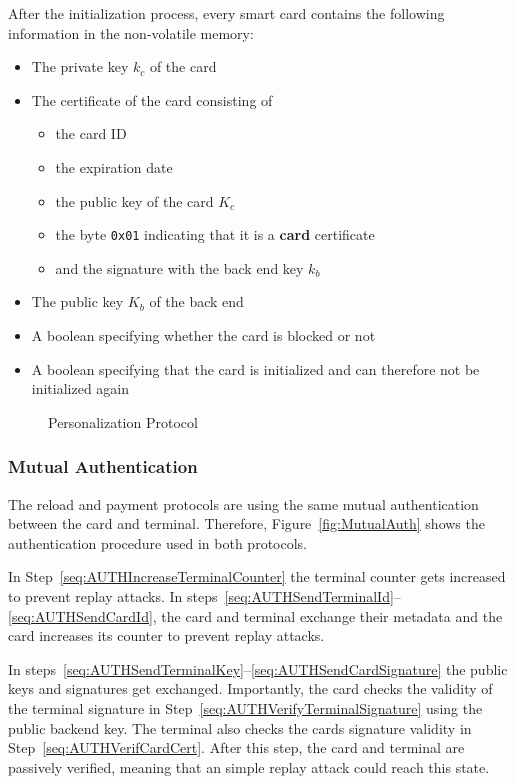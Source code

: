 \documentclass{article}
\begin{document}
After the initialization process, every smart card contains the following information in the non-volatile memory:
\begin{itemize}
    \item The private key $k_c$ of the card
    \item The certificate of the card consisting of
    \begin{itemize}
        \item the card ID
        \item the expiration date
        \item the public key of the card $K_c$
        \item the byte \texttt{0x01} indicating that it is a \textbf{card} certificate
        \item and the signature with the back end key $k_b$
    \end{itemize}
    \item The public key $K_b$ of the back end
    \item A boolean specifying whether the card is blocked or not
    \item A boolean specifying that the card is initialized and can therefore not be initialized again
\end{itemize}

 \begin{figure}[h!]
     \centering
     
     \caption{Personalization Protocol}
     \label{fig:PersonProtocol}
 \end{figure}

\subsubsection{Mutual Authentication} \label{sec:mutualAuth}
The reload and payment protocols are using the same mutual authentication between the card and terminal.
Therefore, Figure~\ref{fig:MutualAuth} shows the authentication procedure used in both protocols.

In Step~\ref{seq:AUTHIncreaseTerminalCounter} the terminal counter gets increased to prevent replay attacks.
In steps~\ref{seq:AUTHSendTerminalId}--\ref{seq:AUTHSendCardId}, the card and terminal exchange their metadata and the card increases its counter to prevent replay attacks.

In steps~\ref{seq:AUTHSendTerminalKey}--\ref{seq:AUTHSendCardSignature} the public keys and signatures get exchanged.
Importantly, the card checks the validity of the terminal signature in Step~\ref{seq:AUTHVerifyTerminalSignature} using the public backend key.
The terminal also checks the cards signature validity in Step~\ref{seq:AUTHVerifCardCert}.
After this step, the card and terminal are passively verified, meaning that an simple replay attack could reach this state.
\end{document}
